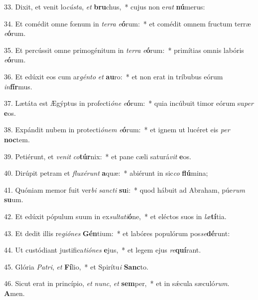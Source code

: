 33. Dixit, et venit lo\textit{cús}\textit{ta}, \textit{et} \textbf{bru}chus,~*  cujus non e\textit{rat} \textbf{nú}merus:\

34. Et comédit omne fœnum in \textit{ter}\textit{ra} \textit{e}\textbf{ó}rum:~*  et comédit omnem fructum terræ \textit{e}\textbf{ó}rum.\

35. Et percússit omne primogénitum in \textit{ter}\textit{ra} \textit{e}\textbf{ó}rum:~*  primítias omnis labóris \textit{e}\textbf{ó}rum.\

36. Et edúxit eos cum ar\textit{gén}\textit{to} \textit{et} \textbf{au}ro:~*  et non erat in tríbubus eórum \textit{in}\textbf{fír}mus.\

37. Lætáta est Ægýptus in profecti\textit{ó}\textit{ne} \textit{e}\textbf{ó}rum:~*  quia incúbuit timor eórum su\textit{per} \textbf{e}os.\

38. Expándit nubem in protecti\textit{ó}\textit{nem} \textit{e}\textbf{ó}rum:~*  et ignem ut lucéret eis \textit{per} \textbf{noc}tem.\

39. Petiérunt, et \textit{ve}\textit{nit} \textit{co}\textbf{túr}nix:~*  et pane cæli saturá\textit{vit} \textbf{e}os.\

40. Dirúpit petram et \textit{flu}\textit{xé}\textit{runt} \textbf{a}quæ:~*  abiérunt in sic\textit{co} \textbf{flú}mina;\

41. Quóniam memor fuit ver\textit{bi} \textit{sanc}\textit{ti} \textbf{su}i:~*  quod hábuit ad Abraham, púe\textit{rum} \textbf{su}um.\

42. Et edúxit pópulum suum in ex\textit{sul}\textit{ta}\textit{ti}\textbf{ó}ne,~*  et eléctos suos in \textit{læ}\textbf{tí}tia.\

43. Et dedit illis re\textit{gi}\textit{ó}\textit{nes} \textbf{Gén}tium:~*  et labóres populórum pos\textit{se}\textbf{dé}runt:\

44. Ut custódiant justifica\textit{ti}\textit{ó}\textit{nes} \textbf{e}jus,~*  et legem ejus \textit{re}\textbf{quí}rant.\

45. Glória \textit{Pa}\textit{tri}, \textit{et} \textbf{Fí}lio,~*  et Spirítu\textit{i} \textbf{Sanc}to.\

46. Sicut erat in princípio, \textit{et} \textit{nunc}, \textit{et} \textbf{sem}per,~*  et in sǽcula sæculó\textit{rum}. \textbf{A}men.\

